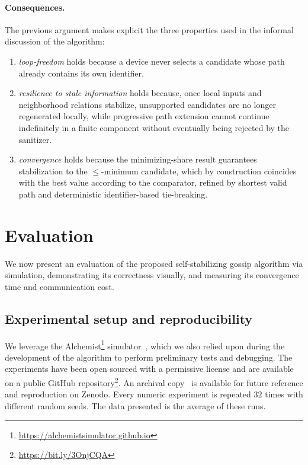 \documentclass[runningheads]{llncs}
\begin{document}
\paragraph{Consequences.}
The previous argument makes explicit the three properties used in the informal discussion of the algorithm:
\begin{enumerate}
    \item \emph{loop-freedom} holds because a device never selects a candidate whose path already contains its own identifier.
    \item \emph{resilience to stale information} holds because, once local inputs and neighborhood relations stabilize,
    unsupported candidates are no longer regenerated locally,
    while progressive path extension cannot continue indefinitely
    in a finite component without eventually being rejected by the sanitizer.
    \item \emph{convergence} holds because the minimizing-share result guarantees stabilization
    to the $\le$-minimum candidate, which by construction coincides with the best value according to the comparator,
    refined by shortest valid path and deterministic identifier-based tie-breaking.
\end{enumerate}

\section{Evaluation}\label{sec:evaluation}

We now present an evaluation of the proposed self-stabilizing gossip algorithm
via simulation, demonstrating its correctness visually, and measuring its convergence time and communication cost.

\subsection{Experimental setup and reproducibility}\label{subsec:experimental-setup-and-reproducibility}

We leverage the Alchemist\footnote{\url{https://alchemistsimulator.github.io}} simulator~\cite{DBLP:journals/jos/PianiniMV13},
which we also relied upon during the development of the algorithm to perform preliminary tests and debugging.
%
The experiments have been open sourced with a permissive license and are available
on a public GitHub repository\footnote{\url{https://bit.ly/3OnjCQA}}.
An archival copy~\cite{experiments-coordination-self-stabilizing-gossip-zenodo}
is available for future reference and reproduction on Zenodo.
%
Every numeric experiment is repeated $32$ times with different random seeds.
%
The data presented is the average of these runs.
\end{document}
